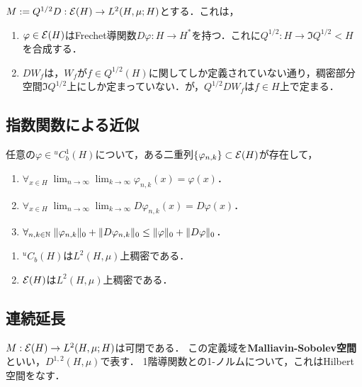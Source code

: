 \documentclass[uplatex,dvipdfmx]{jsreport}
\begin{document}
\begin{definition}
    $M:=Q^{1/2}D:\mathcal{E}(H)\to L^2(H,\mu;H)$とする．これは，
    \begin{enumerate}
        \item $\varphi\in\mathcal{E}(H)$はFrechet導関数$D\varphi:H\to H^*$を持つ．これに$Q^{1/2}:H\to\Im Q^{1/2}<H$を合成する．
        \item $DW_f$は，$W_f$が$f\in Q^{1/2}(H)$に関してしか定義されていない通り，稠密部分空間$\Im Q^{1/2}$上にしか定まっていない．が，$Q^{1/2}DW_f$は$f\in H$上で定まる．
    \end{enumerate}
\end{definition}

\subsection{指数関数による近似}

\begin{proposition}
    任意の$\varphi\in{}^uC_b^1(H)$について，ある二重列$\{\varphi_{n,k}\}\subset\mathcal{E}(H)$が存在して，
    \begin{enumerate}
        \item $\forall_{x\in H}\;\lim_{n\to\infty}\lim_{k\to\infty}\varphi_{n,k}(x)=\varphi(x)$．
        \item $\forall_{x\in H}\;\lim_{n\to\infty}\lim_{k\to\infty}D\varphi_{n,k}(x)=D\varphi(x)$．
        \item $\forall_{n,k\in\mathbb{N}}\;\|\varphi_{n,k}\|_0+\|D\varphi_{n,k}\|_0\le\|\varphi\|_0+\|D\varphi\|_0$．
    \end{enumerate}
\end{proposition}

\begin{corollary}\mbox{}
    \begin{enumerate}
        \item ${}^uC_b(H)$は$L^2(H,\mu)$上稠密である．
        \item $\mathcal{E}(H)$は$L^2(H,\mu)$上稠密である．
    \end{enumerate}
\end{corollary}

\subsection{連続延長}

\begin{proposition}
    $M:\mathcal{E}(H)\to L^2(H,\mu;H)$は可閉である．
    この定義域を\textbf{Malliavin-Sobolev空間}といい，$D^{1,2}(H,\mu)$で表す．
    1階導関数との1-ノルムについて，これはHilbert空間をなす．
\end{proposition}
\end{document}
